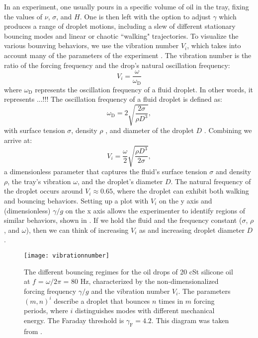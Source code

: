In an experiment, one usually pours in a specific volume of oil in the tray, fixing the values of $\nu$, $\sigma$, and $H$. One is then left with the option to adjust $\gamma$ which produces a range of droplet motions, including a slew of different stationary bouncing modes and linear or chaotic ``walking" trajectories. To visualize the various bounving behaviors, we use the vibration number $V_i$, which takes into account many of the parameters of the experiment . The vibration number is the ratio of the forcing frequency and the drop's natural oscillation frequency:
\begin{equation} \label{vibrationnumber1}
V_i = \frac{\omega}{\omega_\mathrm{D}}
\end{equation}   
where $\omega_\mathrm{D}$ represents the oscillation frequency of a fluid droplet. In other words, it represents ...!!! The oscillation frequency of a fluid droplet is defined as:
\begin{equation} \label{oscillationfrequency}
\omega_\mathrm{D} = 2\sqrt{\frac{2\sigma}{\rho D^3}},
\end{equation}   
with surface tension $\sigma$, density $\rho$ , and diameter of the droplet $D$ . Combining  we arrive at:
\begin{equation} \label{vibrationnumber2}
V_i = \frac{\omega}{2}\sqrt{\frac{\rho D^3}{2\sigma}},
\end{equation}   	       	       
a dimensionless parameter that captures the fluid's surface tension $\sigma$ and density$\rho$, the tray's vibration $\omega$, and the droplet's diameter $D$. The natural frequency of the droplet occurs around $V_i \approx 0.65$, where the droplet can exhibit both walking and bouncing behaviors. Setting up a plot with $V_i$ on the y axis and (dimensionless) ${\gamma}/{g}$ on the x axis allows the experimenter to identify regions of similar behaviors, shown in . If we hold the fluid and the frequency constant ($\sigma$, $\rho$, and $\omega$), then we can think of increasing $V_i$ as and increasing droplet diameter $D$. 
	    
	    \begin{figure}[h]
	       \centering
	    \texttt{[image: vibrationnumber]}
	     \caption{The different bouncing regimes for the oil drops of 20 cSt silicone oil at $f$ = $\omega / 2\pi$ = 80 Hz, characterized by the non-dimensionalized forcing frequency $\gamma/g$ and the vibration number $V_i$. The parameters $(m,n)^{i}$ describe a droplet that bounces $n$ times in $m$ forcing periods, where $i$ distinguishes modes with different mechanical energy. The Faraday threshold is $\gamma_\mathrm{F} = 4.2$. This diagram was taken from .}
	 \label{regime}
	\end{figure}

